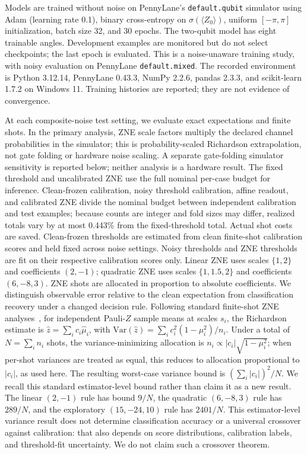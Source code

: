 \documentclass[conference]{IEEEtran}
\begin{document}
Models are trained without noise on PennyLane's \texttt{default.qubit} simulator using Adam (learning rate 0.1), binary cross-entropy on $\sigma(\langle Z_0\rangle)$, uniform $[-\pi,\pi]$ initialization, batch size 32, and 30 epochs. The two-qubit model has eight trainable angles. Development examples are monitored but do not select checkpoints; the last epoch is evaluated. This is a noise-unaware training study, with noisy evaluation on PennyLane \texttt{default.mixed}. The recorded environment is Python 3.12.14, PennyLane 0.43.3, NumPy 2.2.6, pandas 2.3.3, and scikit-learn 1.7.2 on Windows 11. Training histories are reported; they are not evidence of convergence.

At each composite-noise test setting, we evaluate exact expectations and finite shots. In the primary analysis, ZNE scale factors multiply the declared channel probabilities in the simulator; this is probability-scaled Richardson extrapolation, not gate folding or hardware noise scaling. A separate gate-folding simulator sensitivity is reported below; neither analysis is a hardware result. The fixed threshold and uncalibrated ZNE use the full nominal per-case budget for inference. Clean-frozen calibration, noisy threshold calibration, affine readout, and calibrated ZNE divide the nominal budget between independent calibration and test examples; because counts are integer and fold sizes may differ, realized totals vary by at most 0.443\% from the fixed-threshold total. Actual shot costs are saved. Clean-frozen thresholds are estimated from clean finite-shot calibration scores and held fixed across noise settings. Noisy thresholds and ZNE thresholds are fit on their respective calibration scores only. Linear ZNE uses scales $\{1,2\}$ and coefficients $(2,-1)$; quadratic ZNE uses scales $\{1,1.5,2\}$ and coefficients $(6,-8,3)$. ZNE shots are allocated in proportion to absolute coefficients. We distinguish observable error relative to the clean expectation from classification recovery under a changed decision rule. Following standard finite-shot ZNE analyses~\cite{scavino2026,mohammadipourli2025}, for independent Pauli-$Z$ sample means at scales $s_i$, the Richardson estimate is $\hat z=\sum_i c_i\hat\mu_i$, with $\mathrm{Var}(\hat z)=\sum_i c_i^2(1-\mu_i^2)/n_i$. Under a total of $N=\sum_i n_i$ shots, the variance-minimizing allocation is $n_i\propto |c_i|\sqrt{1-\mu_i^2}$; when per-shot variances are treated as equal, this reduces to allocation proportional to $|c_i|$, as used here. The resulting worst-case variance bound is $(\sum_i|c_i|)^2/N$. We recall this standard estimator-level bound rather than claim it as a new result. The linear $(2,-1)$ rule has bound $9/N$, the quadratic $(6,-8,3)$ rule has $289/N$, and the exploratory $(15,-24,10)$ rule has $2401/N$. This estimator-level variance result does not determine classification accuracy or a universal crossover against calibration: that also depends on score distributions, calibration labels, and threshold-fit uncertainty. We do not claim such a crossover theorem.
\end{document}
